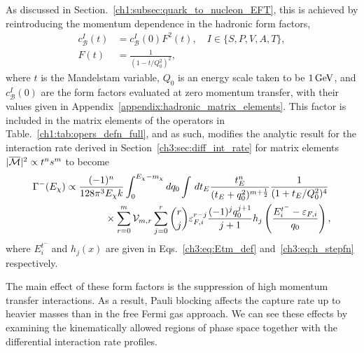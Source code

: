As discussed in Section.~\ref{ch1:subsec:quark_to_nucleon_EFT}, this is achieved by reintroducing the momentum dependence in the hadronic form factors, 
\begin{align}
   c_\mathcal{B}^I(t)  &= c_\mathcal{B}^{I}(0) F^2(t),\quad I\in\{S, P, V, A, T\},\\
   F(t) & = \frac{1}{(1 - t/Q_0^2)^2},\label{ch5:eq:FF_def}
\end{align}
where $t$ is the Mandelstam variable, $Q_0$ is an energy scale taken to be $1{\rm \,GeV}$, and $c_\mathcal{B}^I(0)$ are the form factors evaluated at zero momentum transfer, with their values given in Appendix~\ref{appendix:hadronic_matrix_elements}. This factor is included in the matrix elements of the operators in Table.~\ref{ch1:tab:opers_defn_full}, and as such, modifies the analytic result for the interaction rate derived in Section~\ref{ch3:sec:diff_int_rate} for matrix elements $|\overline{\mathcal M}|^2 \propto t^n s^m$ to become
\begin{equation}
   \begin{split}
       \Gamma^{-}(E_\chi) & \propto \frac{(-1)^n }{128\pi^3 E_\chi k }\int_0^{E_\chi -m_\chi} dq_0\int \, dt_E \frac{ t_E^n}{(t_E + q_0^2)^{m+\frac{1}{2}}}\frac{1}{(1 + t_E/Q_0^2)^4}\\
       &\hspace{4em}\times\sum_{r=0}^m \mathcal{V}_{m,r}\sum_{j = 0}^r\binom{r}{j} \varepsilon_{F,i}^{r-j}  \frac{(-1)^{j} q_0^{j+1}}{j+1} h_j\left( \frac{E_i^{t^-} - \varepsilon_{F,i}}{q_0}\right),
   \end{split}
   \label{ch5:eq:gammaFFfinaltext}
\end{equation}
where $E_i^{t^-}$ and $h_j(x)$ are given in Eqs.~\ref{ch3:eq:Etm_def} and~\ref{ch3:eq:h_stepfn} respectively.

The main effect of these form factors is the suppression of high momentum transfer interactions. As a result, Pauli blocking affects the capture rate up to heavier masses than in the free Fermi gas approach. We can see these effects by examining the kinematically allowed regions of phase space together with the differential interaction rate profiles.



